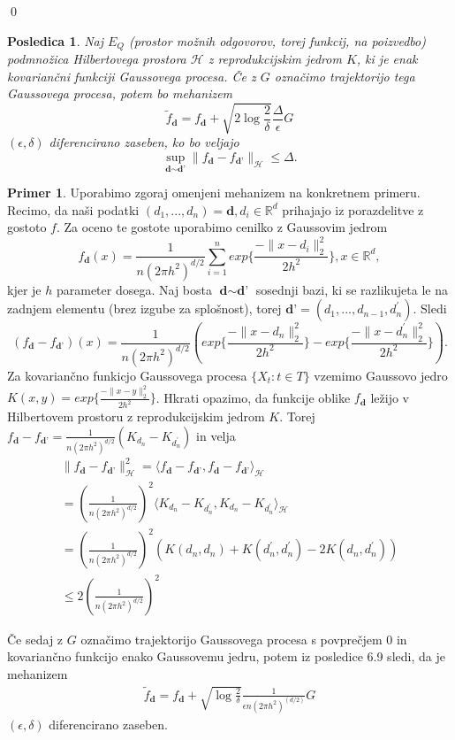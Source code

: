 \documentclass[12pt,a4paper]{amsart}
\theoremstyle{definition} %
\newtheorem{primer}[definicija]{Primer}
\theoremstyle{plain} %
\newtheorem{posledica}[definicija]{Posledica}
\begin{document}
\qed
\begin{posledica}
Naj $E_Q$ (prostor možnih odgovorov, torej funkcij, na poizvedbo) podmnožica Hilbertovega prostora $\mathcal{H}$ z reprodukcijskim jedrom $K$, ki je enak kovariančni funkciji Gaussovega procesa. Če z $G$ označimo trajektorijo tega Gaussovega procesa, potem bo mehanizem 
$$
\widetilde{f}_{\textbf{d}} = f_{\textbf{d}} + \sqrt{2\log{\frac{2}{\delta}}} \frac{\Delta}{\epsilon}G
$$
$(\epsilon,\delta)$ diferencirano zaseben, ko bo veljajo 
$$
\sup_{\textbf{d} \sim \textbf{d'}} \| f_{\textbf{d}} -  f_{\textbf{d'}} \|_{\mathcal{H}} \leq \Delta.
$$
\end{posledica}
 
\begin{primer}
Uporabimo zgoraj omenjeni mehanizem na konkretnem primeru. Recimo, da naši podatki $(d_1,...,d_n) = \textbf{d}, d_i \in \mathbb{R}^d$ prihajajo iz porazdelitve z gostoto $f$. Za oceno te gostote uporabimo cenilko z Gaussovim jedrom
$$
f_{\textbf{d}}(x) = \frac{1}{n(2\pi h^2)^{d/2}} \sum_{i=1}^{n} exp\{\frac{-\|x-d_i\|_{2}^{2}}{2h^2}\},  x \in \mathbb{R}^d,
$$
kjer je $h$ parameter dosega. Naj bosta $\textbf{d} \sim \textbf{d'}$ sosednji bazi, ki se razlikujeta le na zadnjem elementu (brez izgube za splošnost), torej $\textbf{d'} = (d_1,...,d_{n-1},d_{n}^{\prime}) $. Sledi
$$
(f_{\textbf{d}} - f_{\textbf{d'}})(x) = \frac{1}{n(2\pi h^2)^{d/2}} (exp\{\frac{-\|x-d_n\|_{2}^{2}}{2h^2}\}-exp\{\frac{-\|x-d_{n}^{\prime}\|_{2}^{2}}{2h^2}\}).
$$
Za kovariančno funkicjo Gaussovega procesa $\{X_t : t \in T \}$ vzemimo Gaussovo jedro $K(x,y) = exp\{\frac{-\|x-y\|_{2}^{2}}{2h^2}\}$. Hkrati opazimo, da funkcije oblike $f_{\textbf{d}}$ ležijo v Hilbertovem prostoru z reprodukcijskim jedrom $K$. Torej $f_{\textbf{d}} - f_{\textbf{d'}} = \frac{1}{n(2\pi h^2)^{d/2}} (K_{d_n}-K_{d_{n}^{\prime}})$ in velja 
\begin{gather*}
\|f_{\textbf{d}} - f_{\textbf{d'}}\|_{\mathcal{H}}^{2} = \langle f_{\textbf{d}} - f_{\textbf{d'}}, f_{\textbf{d}} - f_{\textbf{d'}} \rangle_{\mathcal{H}}  \\ 
= (\frac{1}{n(2\pi h^2)^{d/2}})^2 \langle K_{d_n}-K_{d_{n}^{\prime}}, K_{d_n}-K_{d_{n}^{\prime}} \rangle_{\mathcal{H}}  \\
= (\frac{1}{n(2\pi h^2)^{d/2}})^2 (K(d_n, d_n)+K(d_{n}^{\prime}, d_{n}^{\prime})-2K(d_n, d_{n}^{\prime})) \\ 
\leq 2 (\frac{1}{n(2\pi h^2)^{d/2}})^2
\end{gather*}

Če sedaj z $G$ označimo trajektorijo Gaussovega procesa s povprečjem 0 in kovariančno funkcijo enako Gaussovemu jedru, potem iz posledice 6.9 sledi, da je mehanizem 
\begin{gather*}
\widetilde{f}_{\textbf{d}} = f_{\textbf{d}} + \sqrt{\log{\frac{2}{\delta}}} \frac{1}{\epsilon n (2\pi h^2)^{(d/2)}}G
\end{gather*}
$(\epsilon, \delta)$ diferencirano zaseben.
\end{primer}
\end{document}
